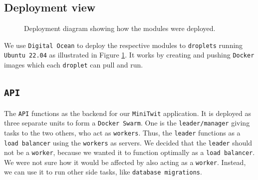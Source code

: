 \subsection{Deployment view}
\begin{figure}[H]
      \centering
      \caption{Deployment diagram showing how the modules were deployed.}
      \label{fig:deployment_diagram}
\end{figure}
We use \texttt{Digital Ocean} to deploy the respective modules to \texttt{droplets} running \texttt{Ubuntu 22.04} as illustrated in Figure \ref{fig:deployment_diagram}. 
It works by creating and pushing \texttt{Docker} images which each \texttt{droplet} can pull and run.

\subsection{\texttt{API}}

The \texttt{API} functions as the backend for our \texttt{MiniTwit} application.
It is deployed as three separate units to form a \texttt{Docker Swarm}. 
One is the \texttt{leader/manager} giving tasks to 
the two others, who act as \texttt{workers}. 
Thus, the \texttt{leader} functions as a \texttt{load balancer} using the \texttt{workers} as servers.
We decided that the \texttt{leader} should not be a \texttt{worker},
because we wanted it to function optimally as a \texttt{load balancer}.
We were not sure how it would be affected by also acting as a \texttt{worker}.
Instead, we can use it to run other side tasks, like \texttt{database migrations}.

